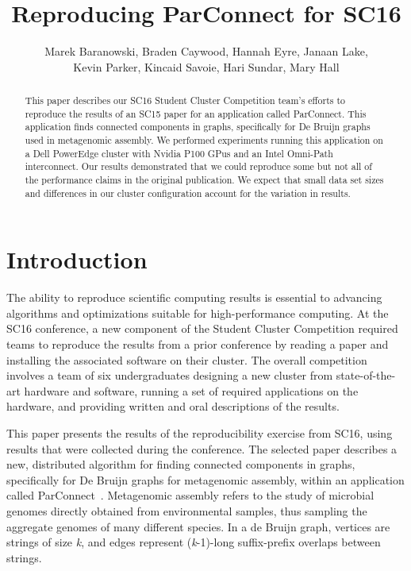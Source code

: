 \documentclass[11pt]{elsarticle}
\title{Reproducing ParConnect for SC16}
\author{Marek Baranowski, Braden Caywood, Hannah Eyre, Janaan Lake, \\Kevin Parker, Kincaid Savoie, Hari Sundar, Mary Hall}
\begin{document}
\begin{abstract}
This paper describes our SC16 Student Cluster Competition team's efforts to reproduce the results of
an SC15 paper for an application called ParConnect.  This application finds connected components in graphs, specifically for De Bruijn graphs used in metagenomic assembly. We performed experiments running this application on a Dell PowerEdge cluster with Nvidia P100 GPus and an Intel Omni-Path interconnect. Our results demonstrated that we could reproduce some but not all of the performance claims in the
original publication.  We expect that small data set sizes and differences in our cluster configuration account for the variation
in results.
\end{abstract}
\maketitle

\section{Introduction}
The ability to reproduce scientific computing results is essential to advancing algorithms and optimizations suitable for high-performance
computing.  At the SC16 conference, a new component of the Student Cluster Competition required teams to reproduce the results from 
a prior conference by reading a paper and installing the associated software on their cluster.  The overall competition involves a team of 
six undergraduates designing a new cluster from state-of-the-art hardware and software, running a set of required applications
on the hardware, and providing written and oral descriptions of the results.

This paper presents the results of the reproducibility exercise from SC16, using results that were collected during the conference.  The 
selected paper describes a new, distributed algorithm for finding connected components in graphs, specifically for De Bruijn graphs for
metagenomic assembly, within an application called ParConnect~\cite{Flick:2015}. Metagenomic assembly refers to the study of microbial
genomes directly obtained from environmental samples, thus sampling the aggregate genomes of many different species.  In a de Bruijn 
graph, vertices are strings of size \textit{k}, and edges represent (\textit{k}-1)-long suffix-prefix overlaps between strings.
\end{document}
